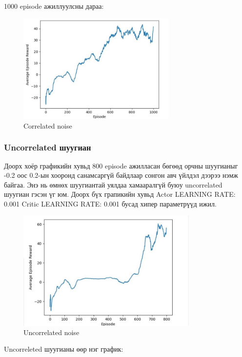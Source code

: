 \documentclass[12pt,A4]{report}
\begin{document}
1000 episode ажиллуулсны дараа:

\begin{figure}[H]
\centering
\includegraphics[width=0.7\textwidth]{./images/after_1000_ep2}
\caption{Correlated noise}
\end{figure}

\subsubsection{Uncorrelated шуугиан}

Доорх хоёр графикийн хувьд 800 episode ажилласан бөгөөд орчны шуугианыг -0.2 оос 0.2-ын хооронд санамсаргүй байдлаар сонгон авч үйлдэл дээрээ нэмж байгаа. Энэ нь өмнөх шуугиантай уялдаа хамааралгүй буюу uncorrelated шуугиан гэсэн үг юм. Доорх бүх грапикийн хувьд Actor LEARNING RATE: 0.001 Critic LEARNING RATE: 0.001 бусад хипер параметрүүд ижил. 

\begin{figure}[H]
\centering
\includegraphics[width=0.8\textwidth]{./images/after_800_ep_02}
\caption{Uncorrelated noise}
\end{figure}

Uncorreleted шуугианы өөр нэг график:
\end{document}
